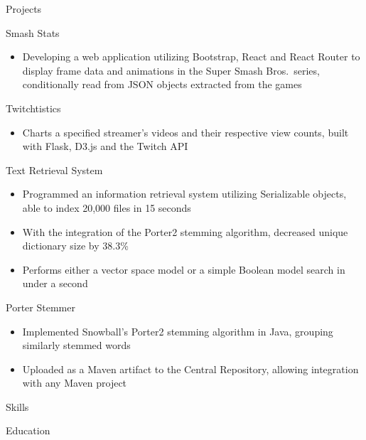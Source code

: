 \documentclass[]{xjavathehutt}
\begin{document}
\begin{cvsection}{Projects}
  \begin{cvproject}{Smash Stats}
    \begin{itemize}
      \item{Developing a web application utilizing Bootstrap, React and React Router to display
          frame data and animations in the Super Smash Bros.\ series, conditionally read from
          JSON objects extracted from the games}
    \end{itemize}
  \end{cvproject}

  \begin{cvproject}{Twitchtistics}
    \begin{itemize}
      \item{Charts a specified streamer's videos and their respective view counts, built with Flask, D3.js and the Twitch API}
    \end{itemize}
  \end{cvproject}

  \begin{cvproject}{Text Retrieval System}
    \begin{itemize}
      \item{Programmed an information retrieval system utilizing Serializable objects, able to index 20,000 files in 15 seconds}
      \item{With the integration of the Porter2 stemming algorithm, decreased unique dictionary size by 38.3\%}
      \item{Performs either a vector space model or a simple Boolean model search in under a second}
    \end{itemize}
  \end{cvproject}

  \begin{cvproject}{Porter Stemmer}
    \begin{itemize}
      \item{Implemented Snowball's Porter2 stemming algorithm in Java, grouping similarly stemmed words}
      \item{Uploaded as a Maven artifact to the Central Repository, allowing integration with any Maven project}
    \end{itemize}
  \end{cvproject}
\end{cvsection}


\begin{cvsection}{Skills}
  \printskills
\end{cvsection}


\begin{cvsection}{Education}
\end{cvsection}


\end{document}
